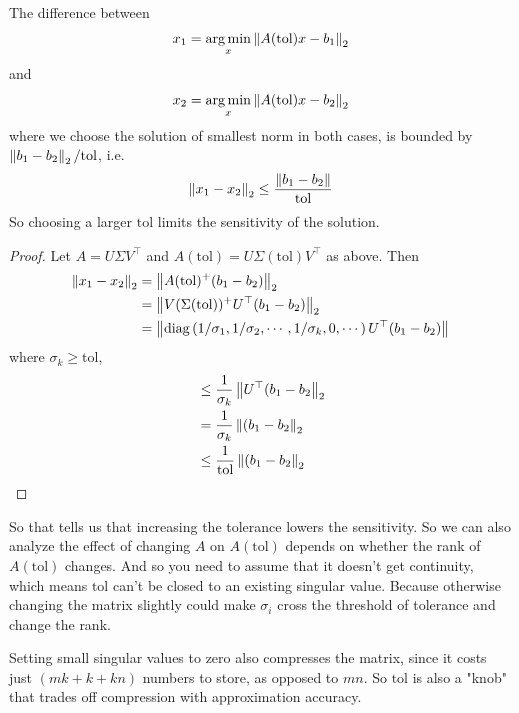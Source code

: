 \documentclass[11pt]{article}
\numberwithin{equation}{section}
\begin{document}
\begin{lemma}
    The difference between \begin{align*}
        x_1 = \underset{x}{\arg \min} \left\| A(\mathrm{tol})x - b_1 \right\|_2
    \end{align*}
    and
    \begin{align*}
        x_2 = \underset{x}{\arg \min} \left\| A(\mathrm{tol})x - b_2 \right\|_2 
    \end{align*}
    where we choose the solution of smallest norm in both cases, is bounded by $\left\| b_1 - b_2 \right\|_2 / \mathrm{tol}$, i.e. \begin{align*}
        \left\| x_1 - x_2 \right\|_2 \leq \frac{\left\| b_1 - b_2 \right\|}{\mathrm{tol}}
    \end{align*}
    So choosing a larger $\mathrm{tol}$ limits the sensitivity of the solution.
    \begin{proof}
        Let $A = U\Sigma V^\top$ and $A(\mathrm{tol}) = U\Sigma(\mathrm{tol})V^\top$ as above. Then \begin{align*}
            \left\|x_{1}-x_{2}\right\|_{2} &= \left\| A(\mathrm{tol})^{+} (b_1-b_2) \right\|_2 \\
            &= \left\| V(\Sigma(\mathrm{tol}))^{+} U^\top (b_1 - b_2) \right\|_2 \\
            &= \left\| \operatorname{diag}\left( 1/\sigma_1,1/\sigma_2, \cdots, 1/\sigma_k, 0, \cdots \right) U^\top (b_1-b_2) \right\|
        \end{align*}
        where $\sigma_k \geq \mathrm{tol}$, \begin{align*}
            &\leq \frac{1}{\sigma_k} \left\| U^\top (b_1-b_2 \right\|_2 \\
            &= \frac{1}{\sigma_k} \left\| (b_1-b_2 \right\|_2 \\
            &\leq \frac{1}{\mathrm{tol}} \left\| (b_1-b_2 \right\|_2 \\
         \end{align*}
    \end{proof}
\end{lemma}

So that tells us that increasing the tolerance lowers the sensitivity. So we can also analyze the effect of changing $A$ on $A(\mathrm{tol})$ 
depends on whether the rank of $A(\mathrm{tol})$ changes. And so you need to assume that it doesn't get continuity, which means $\mathrm{tol}$ can't be closed 
to an existing singular value. Because otherwise changing the matrix slightly could make $\sigma_i$ cross the threshold of tolerance and change the rank.

Setting small singular values to zero also compresses the matrix, since it costs
just $(mk + k + kn)$ numbers to store, as opposed to $mn$. So $\mathrm{tol}$ is also a "knob" that trades off compression with approximation accuracy.
\end{document}
